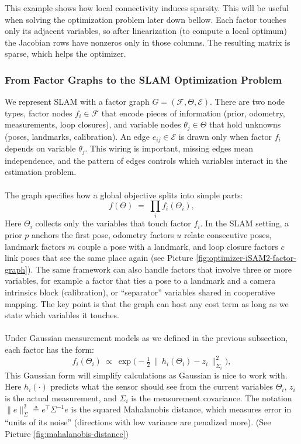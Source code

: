 \noindent
This example shows how local connectivity induces sparsity. This will be useful when solving the optimization problem later down bellow. Each factor touches only its adjacent variables, so after linearization (to compute a local optimum) the Jacobian rows have nonzeros only in those columns. The resulting matrix is sparse, which helps the optimizer.



\subsubsection{From Factor Graphs to the SLAM Optimization Problem}
We represent SLAM with a factor graph $G=(\mathcal{F},\Theta,\mathcal{E})$. There are two node types, factor nodes $f_i\in\mathcal{F}$ that encode pieces of information (prior, odometry, measurements, loop closures), and variable nodes $\theta_j\in\Theta$ that hold unknowns (poses, landmarks, calibration). An edge $e_{ij}\in\mathcal{E}$ is drawn only when factor $f_i$ depends on variable $\theta_j$. This wiring is important, missing edges mean independence, and the pattern of edges controls which variables interact in the estimation problem.
\\ \\
The graph specifies how a global objective splits into simple parts:
\[
    f(\Theta)\;=\;\prod_i f_i(\Theta_i),
\]
Here $\Theta_i$ collects only the variables that touch factor $f_i$. In the SLAM setting, a prior $p$ anchors the first pose, odometry factors $u$ relate consecutive poses, landmark factors $m$ couple a pose with a landmark, and loop closure factors $c$ link poses that see the same place again (see Picture \ref{fig:optimizer-iSAM2-factor-graph}). The same framework can also handle factors that involve three or more variables, for example a factor that ties a pose to a landmark and a camera intrinsics block (calibration), or ``separator'' variables shared in cooperative mapping. The key point is that the graph can host any cost term as long as we state which variables it touches.
\\ \\
Under Gaussian measurement models as we defined in the previous subsection, each factor has the form:
\[
    f_i(\Theta_i)\ \propto\ \exp\!\Big(-\tfrac12\,\|\,h_i(\Theta_i)-z_i\,\|^2_{\Sigma_i}\Big),
\]
This Gaussian form will simplify calculations as Gaussian is nice to work with. Here $h_i(\cdot)$ predicts what the sensor should see from the current variables $\Theta_i$, $z_i$ is the actual measurement, and $\Sigma_i$ is the measurement covariance. The notation $\|e\|^2_{\Sigma}\triangleq e^\top \Sigma^{-1} e$ is the squared Mahalanobis distance, which measures error in ``units of its noise'' (directions with low variance are penalized more). (See Picture \ref{fig:mahalanobis-distance})
